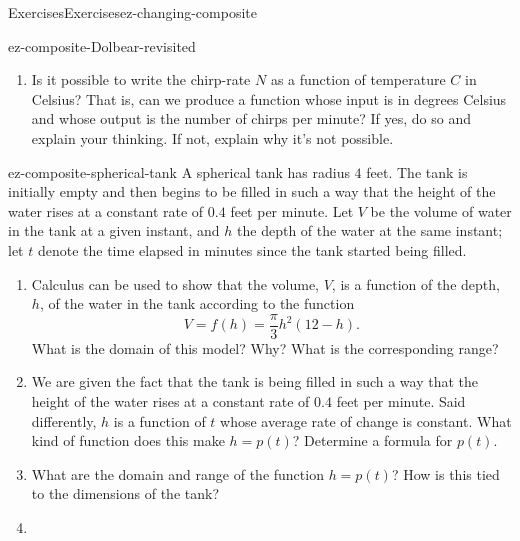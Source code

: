 \begin{exercises-subsection}{Exercises}{}{Exercises}{}{}{ez-changing-composite}
\begin{divisionexercise}{2}{}{}{ez-composite-Dolbear-revisited}
\begin{enumerate}[label=\alph*.]
Recall that the function that converts Fahrenheit to Celcius is \(C = G(F) = \frac{5}{9}(F-32)\). Solve the equation \(C = \frac{5}{9}(F-32)\) for \(F\) in terms of \(C\).  Call the resulting function \(F = p(C)\).  What is the meaning of this function?%
\item\hypertarget{li-237}{}\hypertarget{p-528}{}%
Is it possible to write the chirp-rate \(N\) as a function of temperature \(C\) in Celsius? That is, can we produce a function whose input is in degrees Celsius and whose output is the number of chirps per minute? If yes, do so and explain your thinking.  If not, explain why it's not possible.%
\end{enumerate}
%
\end{divisionexercise}%
\begin{divisionexercise}{3}{}{}{ez-composite-spherical-tank}%
\hypertarget{p-531}{}%
A spherical tank has radius \(4\) feet.  The tank is initially empty and then begins to be filled in such a way that the height of the water rises at a constant rate of \(0.4\) feet per minute.  Let \(V\) be the volume of water in the tank at a given instant, and \(h\) the depth of the water at the same instant; let \(t\) denote the time elapsed in minutes since the tank started being filled.%
\par
\hypertarget{p-532}{}%
\leavevmode%
\begin{enumerate}[label=\alph*.]
\item\hypertarget{li-238}{}\hypertarget{p-533}{}%
Calculus can be used to show that the volume, \(V\), is a function of the depth, \(h\), of the water in the tank according to the function%
\begin{equation}
V = f(h) = \frac{\pi}{3} h^2(12-h)\text{.}\label{E-ez-composite-spherical-tank-V-h}
\end{equation}
What is the domain of this model?  Why?  What is the corresponding range?%
\item\hypertarget{li-239}{}\hypertarget{p-534}{}%
We are given the fact that the tank is being filled in such a way that the height of the water rises at a constant rate of \(0.4\) feet per minute.  Said differently, \(h\) is a function of \(t\) whose average rate of change is constant.  What kind of function does this make \(h = p(t)\)?  Determine a formula for \(p(t)\).%
\item\hypertarget{li-240}{}\hypertarget{p-535}{}%
What are the domain and range of the function \(h = p(t)\)?  How is this tied to the dimensions of the tank?%
\item\hypertarget{li-241}{}\hypertarget{p-536}{}%

\end{enumerate}
\end{divisionexercise}
\end{exercises-subsection}
